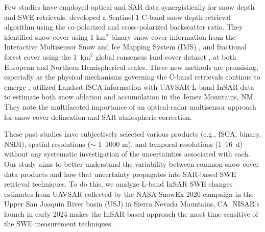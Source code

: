 Few studies have employed optical and SAR data synergistically for snow depth and SWE retrievals. \cite{lievensSnowDepthVariability2019,lievensSentinel1SnowDepth2022} developed a Sentinel-1 C-band snow depth retrieval algorithm using the co-polarized and cross-polarized backscatter ratio. They identified snow cover using 1 km$^{2}$ binary snow cover information from the Interactive Multisensor Snow and Ice Mapping System (IMS) \citep{u.s.nationalicecenterIMSDailyNorthern2008, ramsayInteractiveMultisensorSnow1998, helfrichEnhancementsForthcomingDevelopments2007}, and fractional forest cover using the 1~km$^{2}$ global consensus land cover dataset \citep{tuanmuGlobal1kmConsensus2014}, at both European and Northern Hemispherical scales. These new methods are promising, especially as the physical mechanisms governing the C-band retrievals continue to emerge \citep{zhuModelingScatteringDense2023}. \cite{tarriconeEstimatingSnowAccumulation2023a} utilized Landsat fSCA information with UAVSAR \citep{hensleyUAVSARInstrumentDescription2008} L-band InSAR data to estimate both snow ablation and accumulation in the Jemez Mountains, NM. They note the multifaceted importance of an optical-radar multisensor approach for snow cover delineation and SAR atmospheric correction. 

These past studies have subjectively selected various products (e.g., fSCA, binary, NSDI), spatial resolutions ($\sim$ 1--1000 m), and temporal resolutions (1--16~d) without any systematic investigation of the uncertainties associated with each. Our study aims to better understand the variability between common snow cover data products and how that uncertainty propagates into SAR-based SWE retrieval techniques. To do this, we analyze L-band InSAR SWE changes estimates from UAVSAR collected by the NASA SnowEx 2020 \cite{marshallNASASnowEx20202019} campaign in the Upper San Joaquin River basin (USJ) in Sierra Nevada Mountains, CA. NISAR's launch in early 2024 makes the InSAR-based approach the most time-sensitive of the SWE measurement techniques.



